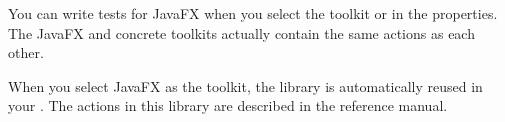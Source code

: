 You can write tests for JavaFX \gdauts{} when you select the toolkit  or  in the \gdproject{} properties. The JavaFX and concrete toolkits actually contain the same actions as each other. 

When you select JavaFX as the \gdproject{} toolkit, the library \gdproject{}  is automatically reused in your \gdproject{}. The actions in this library are described in the reference manual.
